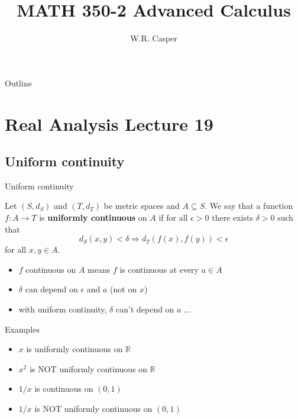 \documentclass{beamer}
\title{MATH 350-2 Advanced Calculus}
\subtitle
{} %
\author[W.R. Casper] %
{W.R. Casper}
\institute[California State University Fullerton] %
{
  Department of Mathematics\\
  California State University Fullerton}
\begin{document}
\begin{frame}
  \titlepage
\end{frame}

\begin{frame}{Outline}
  \tableofcontents
\end{frame}



\section{Real Analysis Lecture 19}

\subsection{Uniform continuity}

\begin{frame}{Uniform continuity}
\begin{defn}
Let $(S,d_S)$ and $(T,d_T)$ be metric spaces and $A\subseteq S$.
We say that a function $f: A\rightarrow T$ is \textbf{uniformly continuous} on $A$ if for all $\epsilon > 0$ there exists $\delta > 0$ such that
$$d_S(x,y)< \delta \Rightarrow d_T(f(x),f(y))< \epsilon$$
for all $x,y\in A$.
\end{defn}
\begin{itemize}
\item $f$ continuous on $A$ means $f$ is continuous at every $a\in A$
\item $\delta$ can depend on $\epsilon$ and $a$ (not on $x$)
\item with uniform continuity, $\delta$ can't depend on $a$ ...
\end{itemize}
\end{frame}

\begin{frame}{Examples}
\begin{itemize}
\item $x$ is uniformly continuous on $\mathbb R$
\item $x^2$ is NOT uniformly continuous on $\mathbb R$
\item $1/x$ is continuous on $(0,1)$
\item $1/x$ is NOT uniformly continuous on $(0,1)$
\end{itemize}
\end{frame}
\end{document}
